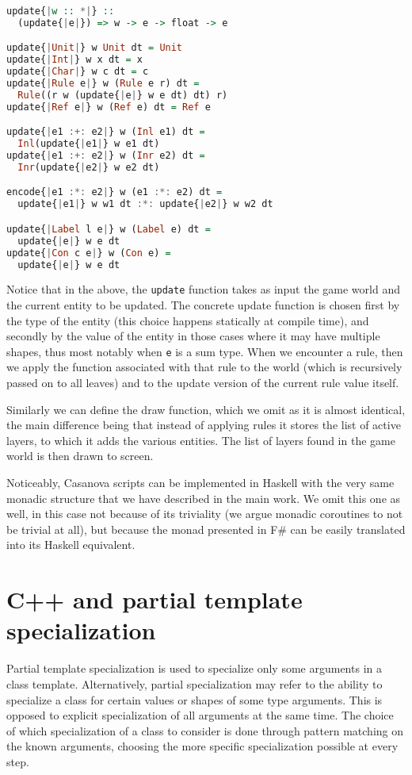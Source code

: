 \begin{lstlisting}[language=Haskell]
update{|w :: *|} :: 
  (update{|e|}) => w -> e -> float -> e

update{|Unit|} w Unit dt = Unit
update{|Int|} w x dt = x
update{|Char|} w c dt = c
update{|Rule e|} w (Rule e r) dt = 
  Rule((r w (update{|e|} w e dt) dt) r)
update{|Ref e|} w (Ref e) dt = Ref e

update{|e1 :+: e2|} w (Inl e1) dt = 
  Inl(update{|e1|} w e1 dt)
update{|e1 :+: e2|} w (Inr e2) dt = 
  Inr(update{|e2|} w e2 dt)

encode{|e1 :*: e2|} w (e1 :*: e2) dt = 
  update{|e1|} w w1 dt :*: update{|e2|} w w2 dt

update{|Label l e|} w (Label e) dt = 
  update{|e|} w e dt
update{|Con c e|} w (Con e) = 
  update{|e|} w e dt
\end{lstlisting}

Notice that in the above, the \texttt{update} function takes as input the game world and the current entity to be updated. The concrete update function is chosen first by the type of the entity (this choice happens statically at compile time), and secondly by the value of the entity in those cases where it may have multiple shapes, thus most notably when \texttt{e} is a sum type. When we encounter a rule, then we apply the function associated with that rule to the world (which is recursively passed on to all leaves) and to the update version of the current rule value itself.

Similarly we can define the draw function, which we omit as it is almost identical, the main difference being that instead of applying rules it stores the list of active layers, to which it adds the various entities. The list of layers found in the game world is then drawn to screen.

Noticeably, Casanova scripts can be implemented in Haskell with the very same monadic structure that we have described in the main work. We omit this one as well, in this case not because of its triviality (we argue monadic coroutines to not be trivial at all), but because the monad presented in F\# can be easily translated into its Haskell equivalent.


\section{C++ and partial template specialization}
Partial template specialization is used to specialize only some arguments in a class template. Alternatively, partial specialization may refer to the ability to specialize a class for certain values or shapes of some type arguments. This is opposed to explicit specialization of all arguments at the same time.  The choice of which specialization of a class to consider is done through pattern matching on the known arguments, choosing the more specific specialization possible at every step.

